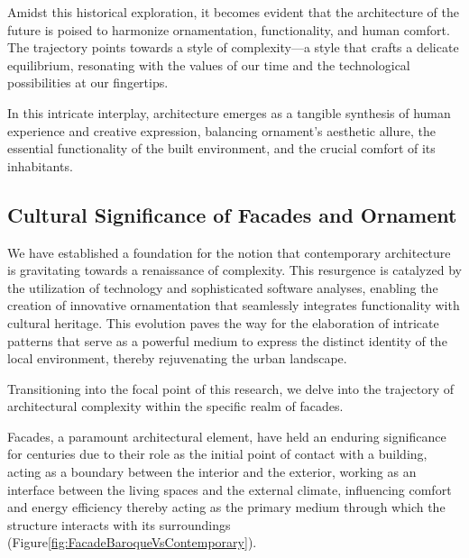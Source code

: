 Amidst this historical exploration, it becomes evident that the architecture of the future is poised to harmonize ornamentation, functionality, and human comfort.
The trajectory points towards a style of complexity—a style that crafts a delicate equilibrium, resonating with the values of our time and the technological possibilities at our fingertips.

In this intricate interplay, architecture emerges as a tangible synthesis of human experience and creative expression, balancing ornament's aesthetic allure, the essential functionality of the built environment, and the crucial comfort of its inhabitants.

\subsection{Cultural Significance of Facades and Ornament}
\label{subsec: FacadeandOrnament}
We have established a foundation for the notion that contemporary architecture is gravitating towards a renaissance of complexity.
This resurgence is catalyzed by the utilization of technology and sophisticated software analyses, enabling the creation of innovative ornamentation that seamlessly integrates functionality with cultural heritage.
This evolution paves the way for the elaboration of intricate patterns that serve as a powerful medium to express the distinct identity of the local environment, thereby rejuvenating the urban landscape.

Transitioning into the focal point of this research, we delve into the trajectory of architectural complexity within the specific realm of facades.

Facades, a paramount architectural element, have held an enduring significance for centuries due to their role as the initial point of contact with a building, acting as a boundary between the interior and the exterior, working as an interface between the living spaces and the external climate, influencing comfort and energy efficiency\cite{Kamal2020} thereby acting as the primary medium through which the structure interacts with its surroundings (Figure\ref{fig:FacadeBaroqueVsContemporary}).

